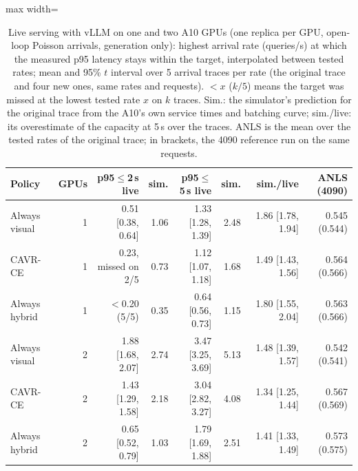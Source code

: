 \begin{table}[t]
\centering
\caption{Live serving with vLLM on one and two A10 GPUs (one replica per GPU, open-loop Poisson arrivals, generation only): highest arrival rate (queries/s) at which the measured p95 latency stays within the target, interpolated between tested rates; mean and 95\% $t$ interval over 5 arrival traces per rate (the original trace and four new ones, same rates and requests). $<x$ ($k/5$) means the target was missed at the lowest tested rate $x$ on $k$ traces. Sim.: the simulator's prediction for the original trace from the A10's own service times and batching curve; sim./live: its overestimate of the capacity at 5\,s over the traces. ANLS is the mean over the tested rates of the original trace; in brackets, the 4090 reference run on the same requests.}
\label{tab:live_serving}
\begin{adjustbox}{max width=\linewidth}
\begin{tabular}{lrrrrrrr}
\toprule
\textbf{Policy} & \textbf{GPUs} & \textbf{p95$\leq$2\,s live} & \textbf{sim.} & \textbf{p95$\leq$5\,s live} & \textbf{sim.} & \textbf{sim./live} & \textbf{ANLS (4090)} \\
\midrule
Always visual & 1 & 0.51 [0.38, 0.64] & 1.06 & 1.33 [1.28, 1.39] & 2.48 & 1.86 [1.78, 1.94] & 0.545 (0.544) \\
CAVR-CE & 1 & 0.23, missed on 2/5 & 0.73 & 1.12 [1.07, 1.18] & 1.68 & 1.49 [1.43, 1.56] & 0.564 (0.566) \\
Always hybrid & 1 & $<$0.20 (5/5) & 0.35 & 0.64 [0.56, 0.73] & 1.15 & 1.80 [1.55, 2.04] & 0.563 (0.566) \\
Always visual & 2 & 1.88 [1.68, 2.07] & 2.74 & 3.47 [3.25, 3.69] & 5.13 & 1.48 [1.39, 1.57] & 0.542 (0.541) \\
CAVR-CE & 2 & 1.43 [1.29, 1.58] & 2.18 & 3.04 [2.82, 3.27] & 4.08 & 1.34 [1.25, 1.44] & 0.567 (0.569) \\
Always hybrid & 2 & 0.65 [0.52, 0.79] & 1.03 & 1.79 [1.69, 1.88] & 2.51 & 1.41 [1.33, 1.49] & 0.573 (0.575) \\
\bottomrule
\end{tabular}
\end{adjustbox}
\end{table}
